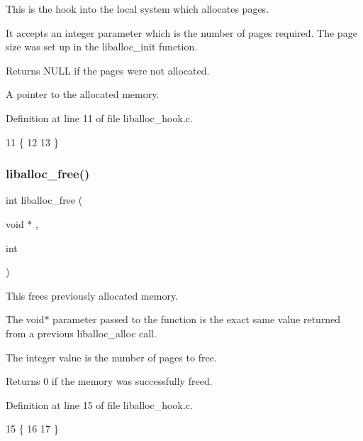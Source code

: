 This is the hook into the local system which allocates pages. 

It accepts an integer parameter which is the number of pages required. The page size was set up in the liballoc\+\_\+init function.

\begin{DoxyReturn}{Returns}
N\+U\+LL if the pages were not allocated. 

A pointer to the allocated memory. 
\end{DoxyReturn}


Definition at line 11 of file liballoc\+\_\+hook.\+c.


\begin{DoxyCode}
11                                 \{
12 
13 \}
\end{DoxyCode}
\mbox{\label{a00026_a1653870893230580e5d605148aa3c37a_a1653870893230580e5d605148aa3c37a}} 
\subsubsection{\texorpdfstring{liballoc\+\_\+free()}{liballoc\_free()}}
{\footnotesize\ttfamily int liballoc\+\_\+free (\begin{DoxyParamCaption}\item[{void $\ast$}]{,  }\item[{int}]{ }\end{DoxyParamCaption})}



This frees previously allocated memory. 

The void$\ast$ parameter passed to the function is the exact same value returned from a previous liballoc\+\_\+alloc call.

The integer value is the number of pages to free.

\begin{DoxyReturn}{Returns}
0 if the memory was successfully freed. 
\end{DoxyReturn}


Definition at line 15 of file liballoc\+\_\+hook.\+c.


\begin{DoxyCode}
15                                         \{
16 
17 \}
\end{DoxyCode}
\mbox{\label{a00026_a8b5670e4594b0b6f8be78fe17f0c3b53_a8b5670e4594b0b6f8be78fe17f0c3b53}} 
